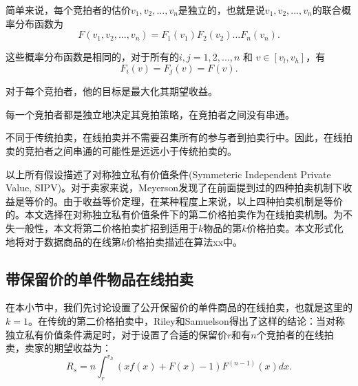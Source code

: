 \begin{assmp}[估价的独立性]
\label{conj:independent value}
  简单来说，每个竞拍者的估价$v_1,v_2,...,v_n$是独立的，也就是说$v_1,v_2,...,v_n$的联合概率分布函数为
  \begin{equation}
	F(v_1,v_2,...,v_n)=F_1(v_1)F_2(v_2)...F_n(v_n).
	\end{equation}
 
\end{assmp}

\begin{assmp}[估价分布函数的对称性]
\label{conj:symmetric distribution function}
这些概率分布函数是相同的，对于所有的$i,j=1,2,...,n$ 和 $v\in[v_l,v_h]$，有
	\begin{equation}
	F_i(v)=F_j(v)=F(v).
	\end{equation}
 
\end{assmp}

\begin{assmp}[竞拍者风险中立]
\label{conj:risk nuetral}
对于每个竞拍者，他的目标是最大化其期望收益。
 
\end{assmp}

\begin{assmp}[无串通性]
\label{conj:no collusion}
每一个竞拍者都是独立地决定其竞拍策略，在竞拍者之间没有串通。
\end{assmp}

不同于传统拍卖，在线拍卖并不需要召集所有的参与者到拍卖行中。因此，在线拍卖的竞拍者之间串通的可能性是远远小于传统拍卖的。

以上所有假设描述了对称独立私有价值条件(Symmeteric Independent Private Value, SIPV)。对于卖家来说，Meyerson\cite{Myerson1981Optimal}发现了在前面提到过的四种拍卖机制下收益是等价的。由于收益等价定理，在某种程度上来说，以上四种拍卖机制是等价的。本文选择在对称独立私有价值条件下的第二价格拍卖作为在线拍卖机制。为不失一般性，本文将第二价格拍卖扩招到适用于$k$物品的第$k$价格拍卖。本文形式化地将对于数据商品的在线第$k$价格拍卖描述在算法xx中。



\subsection{带保留价的单件物品在线拍卖}

在本小节中，我们先讨论设置了公开保留价的单件商品的在线拍卖，也就是这里的$k=1$。在传统的第二价格拍卖中，Riley和Samuelson\cite{Riley1981Optimal}得出了这样的结论：当对称独立私有价值条件满足时，对于设置了合适的保留价$r$和有$n$个竞拍者的在线拍卖，卖家的期望收益为：
\begin{equation}
\label{eq:basic expected revenue}
R_s=n\int_{r}^{v_h}(xf(x)+F(x)-1)F^{(n-1)}(x)dx.
\end{equation}

